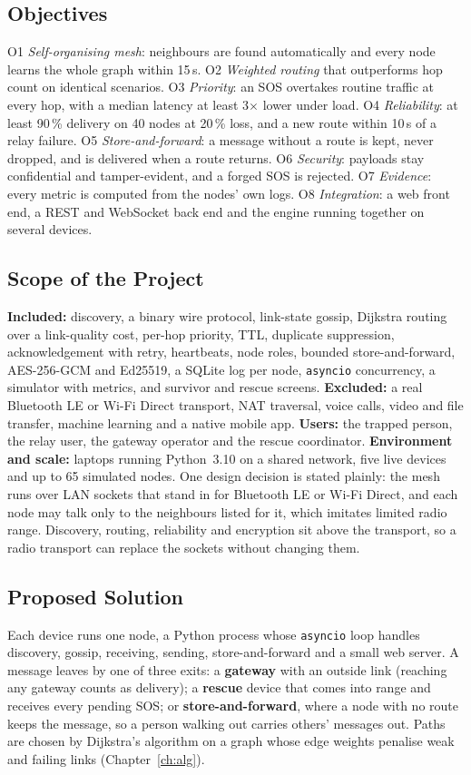 \subsection{Objectives}
O1 \emph{Self-organising mesh}: neighbours are found automatically and every node learns the whole graph within 15\,s. O2 \emph{Weighted routing} that outperforms hop count on identical scenarios. O3 \emph{Priority}: an SOS overtakes routine traffic at every hop, with a median latency at least 3$\times$ lower under load. O4 \emph{Reliability}: at least 90\,\% delivery on 40 nodes at 20\,\% loss, and a new route within 10\,s of a relay failure. O5 \emph{Store-and-forward}: a message without a route is kept, never dropped, and is delivered when a route returns. O6 \emph{Security}: payloads stay confidential and tamper-evident, and a forged SOS is rejected. O7 \emph{Evidence}: every metric is computed from the nodes' own logs. O8 \emph{Integration}: a web front end, a REST and WebSocket back end and the engine running together on several devices.

\subsection{Scope of the Project}
\textbf{Included:} discovery, a binary wire protocol, link-state gossip, Dijkstra routing over a link-quality cost, per-hop priority, TTL, duplicate suppression, acknowledgement with retry, heartbeats, node roles, bounded store-and-forward, AES-256-GCM and Ed25519, a SQLite log per node, \texttt{asyncio} concurrency, a simulator with metrics, and survivor and rescue screens. \textbf{Excluded:} a real Bluetooth LE or Wi-Fi Direct transport, NAT traversal, voice calls, video and file transfer, machine learning and a native mobile app. \textbf{Users:} the trapped person, the relay user, the gateway operator and the rescue coordinator. \textbf{Environment and scale:} laptops running Python~3.10 on a shared network, five live devices and up to 65 simulated nodes. One design decision is stated plainly: the mesh runs over LAN sockets that stand in for Bluetooth LE or Wi-Fi Direct, and each node may talk only to the neighbours listed for it, which imitates limited radio range. Discovery, routing, reliability and encryption sit above the transport, so a radio transport can replace the sockets without changing them.

\subsection{Proposed Solution}
Each device runs one node, a Python process whose \texttt{asyncio} loop handles discovery, gossip, receiving, sending, store-and-forward and a small web server. A message leaves by one of three exits: a \textbf{gateway} with an outside link (reaching any gateway counts as delivery); a \textbf{rescue} device that comes into range and receives every pending SOS; or \textbf{store-and-forward}, where a node with no route keeps the message, so a person walking out carries others' messages out. Paths are chosen by Dijkstra's algorithm on a graph whose edge weights penalise weak and failing links (Chapter~\ref{ch:alg}).

